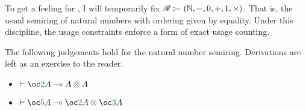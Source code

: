 To get a feeling for \name{}, I will temporarily fix
$\mathscr R \coloneqq (\mathbb N, =, 0, +, 1, \times)$.
That is, the usual semiring of natural numbers with ordering given by equality.
Under this discipline, the usage constraints enforce a form of exact usage
counting.

\begin{example}
  The following judgements hold for the natural number semiring.
  Derivations are left as an exercise to the reader.
  \begin{itemize}
    \item $\vdash \oc\gr2A \multimap A \otimes A$
    \item $\vdash \oc\gr5A \multimap \oc\gr2A \otimes \oc\gr3A$
  \end{itemize}
\end{example}
